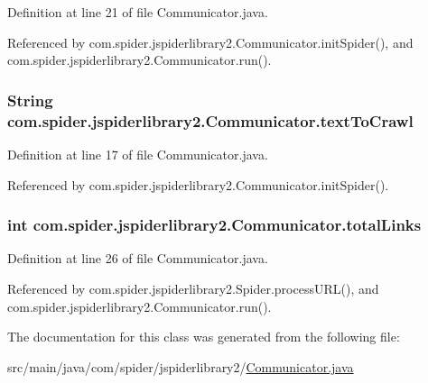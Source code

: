 \-Definition at line 21 of file \-Communicator.\-java.



\-Referenced by com.\-spider.\-jspiderlibrary2.\-Communicator.\-init\-Spider(), and com.\-spider.\-jspiderlibrary2.\-Communicator.\-run().

\hypertarget{classcom_1_1spider_1_1jspiderlibrary2_1_1_communicator_a77d1d4556b66f56aad5fe9e1afda94d6}{
\subsubsection[{text\-To\-Crawl}]{\setlength{\rightskip}{0pt plus 5cm}\-String {\bf com.\-spider.\-jspiderlibrary2.\-Communicator.\-text\-To\-Crawl}}}\label{classcom_1_1spider_1_1jspiderlibrary2_1_1_communicator_a77d1d4556b66f56aad5fe9e1afda94d6}


\-Definition at line 17 of file \-Communicator.\-java.



\-Referenced by com.\-spider.\-jspiderlibrary2.\-Communicator.\-init\-Spider().

\hypertarget{classcom_1_1spider_1_1jspiderlibrary2_1_1_communicator_af85276b4b0e742776669cd6af974480c}{
\subsubsection[{total\-Links}]{\setlength{\rightskip}{0pt plus 5cm}int {\bf com.\-spider.\-jspiderlibrary2.\-Communicator.\-total\-Links}}}\label{classcom_1_1spider_1_1jspiderlibrary2_1_1_communicator_af85276b4b0e742776669cd6af974480c}


\-Definition at line 26 of file \-Communicator.\-java.



\-Referenced by com.\-spider.\-jspiderlibrary2.\-Spider.\-process\-U\-R\-L(), and com.\-spider.\-jspiderlibrary2.\-Communicator.\-run().



\-The documentation for this class was generated from the following file\-:\begin{DoxyCompactItemize}
\item 
src/main/java/com/spider/jspiderlibrary2/\hyperlink{_communicator_8java}{\-Communicator.\-java}\end{DoxyCompactItemize}
